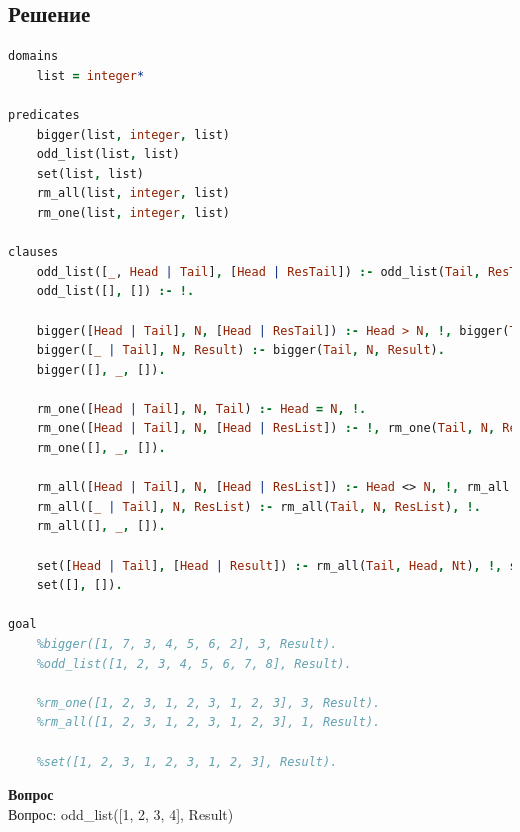 \documentclass[12pt]{report}
\begin{document}
\subsection*{Решение}
\begin{lstlisting}[language=prolog]
domains
	list = integer*

predicates
	bigger(list, integer, list)
	odd_list(list, list)
	set(list, list)
	rm_all(list, integer, list)
	rm_one(list, integer, list)

clauses
	odd_list([_, Head | Tail], [Head | ResTail]) :- odd_list(Tail, ResTail).
	odd_list([], []) :- !.
	
	bigger([Head | Tail], N, [Head | ResTail]) :- Head > N, !, bigger(Tail, N, ResTail).
	bigger([_ | Tail], N, Result) :- bigger(Tail, N, Result).
	bigger([], _, []).
	
	rm_one([Head | Tail], N, Tail) :- Head = N, !.
	rm_one([Head | Tail], N, [Head | ResList]) :- !, rm_one(Tail, N, ResList).
	rm_one([], _, []).
	
	rm_all([Head | Tail], N, [Head | ResList]) :- Head <> N, !, rm_all(Tail, N, ResList).
	rm_all([_ | Tail], N, ResList) :- rm_all(Tail, N, ResList), !.
	rm_all([], _, []).
	
	set([Head | Tail], [Head | Result]) :- rm_all(Tail, Head, Nt), !, set(Nt, Result).
	set([], []).

goal
	%bigger([1, 7, 3, 4, 5, 6, 2], 3, Result).
	%odd_list([1, 2, 3, 4, 5, 6, 7, 8], Result).
	
	%rm_one([1, 2, 3, 1, 2, 3, 1, 2, 3], 3, Result).
	%rm_all([1, 2, 3, 1, 2, 3, 1, 2, 3], 1, Result).
	
	%set([1, 2, 3, 1, 2, 3, 1, 2, 3], Result).
\end{lstlisting}

\newpage

\textbf{Вопрос}\\

Вопрос: odd\_list([1, 2, 3, 4], Result)
\end{document}
